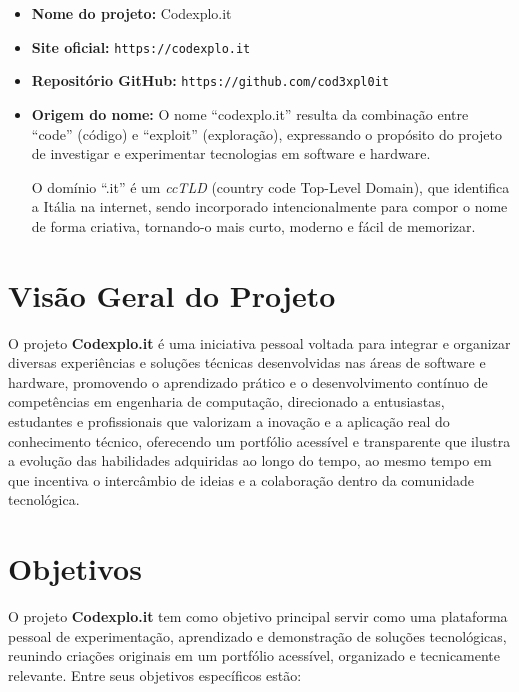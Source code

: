 \documentclass[10pt, a4paper, oneside]{article}
\begin{document}
\begin{itemize}
  \item \textbf{Nome do projeto:} Codexplo.it  
  \item \textbf{Site oficial:} \texttt{https://codexplo.it}  
  \item \textbf{Repositório GitHub:} \texttt{https://github.com/cod3xpl0it}  
  \item \textbf{Origem do nome:}  
  O nome “codexplo.it” resulta da combinação entre “code” (código) e “exploit” (exploração), expressando o propósito do projeto de investigar e experimentar tecnologias em software e hardware.\newline
  
  O domínio “.it” é um \textit{ccTLD} (country code Top-Level Domain), que identifica a Itália na internet, sendo incorporado intencionalmente para compor o nome de forma criativa, tornando-o mais curto, moderno e fácil de memorizar.  
\end{itemize}

\section{Visão Geral do Projeto}

O projeto \textbf{Codexplo.it} é uma iniciativa pessoal voltada para integrar e organizar diversas experiências e soluções técnicas desenvolvidas nas áreas de software e hardware, promovendo o aprendizado prático e o desenvolvimento contínuo de competências em engenharia de computação, direcionado a entusiastas, estudantes e profissionais que valorizam a inovação e a aplicação real do conhecimento técnico, oferecendo um portfólio acessível e transparente que ilustra a evolução das habilidades adquiridas ao longo do tempo, ao mesmo tempo em que incentiva o intercâmbio de ideias e a colaboração dentro da comunidade tecnológica.

\section{Objetivos}

O projeto \textbf{Codexplo.it} tem como objetivo principal servir como uma plataforma pessoal de experimentação, aprendizado e demonstração de soluções tecnológicas, reunindo criações originais em um portfólio acessível, organizado e tecnicamente relevante. Entre seus objetivos específicos estão:
\end{document}
